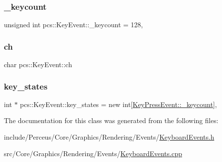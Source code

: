 \subsubsection{\texorpdfstring{\+\_\+keycount}{\_keycount}}
{\footnotesize\ttfamily unsigned int pcs\+::\+Key\+Event\+::\+\_\+keycount = 128\hspace{0.3cm}{\ttfamily [static]}, {\ttfamily [private]}}

\mbox{\label{classpcs_1_1KeyEvent_a583b56025e205125c2eae41f17e442e6}} 
\subsubsection{\texorpdfstring{ch}{ch}}
{\footnotesize\ttfamily char pcs\+::\+Key\+Event\+::ch\hspace{0.3cm}{\ttfamily [private]}}

\mbox{\label{classpcs_1_1KeyEvent_ade70c09116e673cc43d15721dea95965}} 
\subsubsection{\texorpdfstring{key\+\_\+states}{key\_states}}
{\footnotesize\ttfamily int $\ast$ pcs\+::\+Key\+Event\+::key\+\_\+states = new int\mbox{[}\hyperlink{classpcs_1_1KeyEvent_a4704e9758c494ee99e83226714b58412}{Key\+Press\+Event\+::\+\_\+keycount}\mbox{]}\hspace{0.3cm}{\ttfamily [static]}, {\ttfamily [private]}}



The documentation for this class was generated from the following files\+:\begin{DoxyCompactItemize}
\item 
include/\+Perceus/\+Core/\+Graphics/\+Rendering/\+Events/\hyperlink{KeyboardEvents_8h}{Keyboard\+Events.\+h}\item 
src/\+Core/\+Graphics/\+Rendering/\+Events/\hyperlink{KeyboardEvents_8cpp}{Keyboard\+Events.\+cpp}\end{DoxyCompactItemize}
